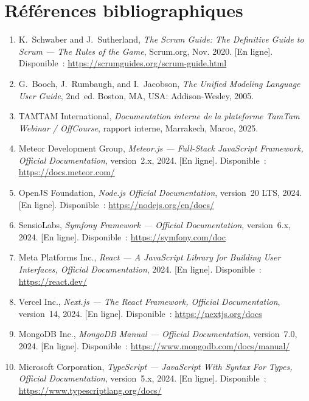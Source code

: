 \documentclass{rapportPFEHIND}
\begin{document}


\cleardoublepage
{}
\section*{Références bibliographiques}

\begin{enumerate}

\item K.~Schwaber and J.~Sutherland, \textit{The Scrum Guide: The Definitive Guide to Scrum --- The Rules of the Game}, Scrum.org, Nov. 2020. [En ligne]. Disponible~: \url{https://scrumguides.org/scrum-guide.html}

\item G.~Booch, J.~Rumbaugh, and I.~Jacobson, \textit{The Unified Modeling Language User Guide}, 2nd~ed. Boston, MA, USA: Addison-Wesley, 2005.

\item TAMTAM International, \textit{Documentation interne de la plateforme TamTam Webinar / OffCourse}, rapport interne, Marrakech, Maroc, 2025.

\item Meteor Development Group, \textit{Meteor.js --- Full-Stack JavaScript Framework, Official Documentation}, version~2.x, 2024. [En ligne]. Disponible~: \url{https://docs.meteor.com/}

\item OpenJS Foundation, \textit{Node.js Official Documentation}, version~20 LTS, 2024. [En ligne]. Disponible~: \url{https://nodejs.org/en/docs/}

\item SensioLabs, \textit{Symfony Framework --- Official Documentation}, version~6.x, 2024. [En ligne]. Disponible~: \url{https://symfony.com/doc}

\item Meta Platforms Inc., \textit{React --- A JavaScript Library for Building User Interfaces, Official Documentation}, 2024. [En ligne]. Disponible~: \url{https://react.dev/}

\item Vercel Inc., \textit{Next.js --- The React Framework, Official Documentation}, version~14, 2024. [En ligne]. Disponible~: \url{https://nextjs.org/docs}

\item MongoDB Inc., \textit{MongoDB Manual --- Official Documentation}, version~7.0, 2024. [En ligne]. Disponible~: \url{https://www.mongodb.com/docs/manual/}

\item Microsoft Corporation, \textit{TypeScript --- JavaScript With Syntax For Types, Official Documentation}, version~5.x, 2024. [En ligne]. Disponible~: \url{https://www.typescriptlang.org/docs/}

\end{enumerate}
\end{document}
